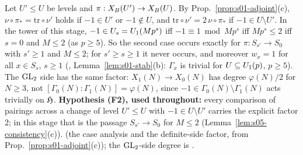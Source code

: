 \begin{remark}\label{rem:s05-factor2}
Let $U'\le U$ be levels and $\pi:X_B(U')\to X_B(U)$. By Prop.~\ref{prop:s01-adjoint}(c), $\nu\circ\pi_*=\mathrm{tr}\circ\nu'$
holds if $-1\in U'$ or $-1\notin U$, and $\mathrm{tr}\circ\nu'=2\,\nu\circ\pi_*$ if $-1\in U\setminus U'$. In the tower of this stage,
$-1\in U_s=U_1(Mp^s)$ iff $-1\equiv1\bmod Mp^s$ iff $Mp^s\le2$ iff $s=0$ and $M\le2$ (as $p\ge5$). So the second case occurs exactly
for $\pi:S_{s'}\to S_0$ with $s'\ge1$ and $M\le2$; for $s'\ge s\ge1$ it never occurs, and moreover $w_x=1$ for all $x\in S_s$, $s\ge1$
(, Lemma~\ref{lem:s01-stab}(b): $\Gamma_x$ is trivial for $U\subseteq U_1(p)$, $p\ge5$). The $\mathrm{GL}_2$ side has
the same factor: $X_1(N)\to X_0(N)$ has degree $\varphi(N)/2$ for $N\ge3$, not $[\Gamma_0(N):\Gamma_1(N)]=\varphi(N)$, since
$-1\in\Gamma_0(N)\setminus\Gamma_1(N)$ acts trivially on $\mathfrak{H}$.
\textbf{Hypothesis (F2), used throughout:} every comparison of pairings across a change of level $U'\le U$ with $-1\in U\setminus U'$ carries the
explicit factor $2$; in this stage that is the passage $S_{s'}\to S_0$ for $M\le2$ (Lemma~\ref{lem:s05-consistency}(c)).
\stproved{} (the case analysis and the definite-side factor, from Prop.~\ref{prop:s01-adjoint}(c)); the $\mathrm{GL}_2$-side degree is \stknown.
\end{remark}

